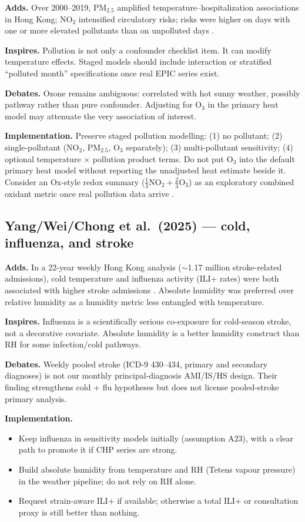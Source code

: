 \documentclass[11pt]{article}
\newcommand{\adds}{\textcolor{green!40!black}{\textbf{Adds.}}}
\newcommand{\inspires}{\textcolor{blue!55!black}{\textbf{Inspires.}}}
\newcommand{\debates}{\textcolor{orange!70!black}{\textbf{Debates.}}}
\newcommand{\impl}{\textcolor{purple!55!black}{\textbf{Implementation.}}}
\begin{document}
\adds{} Over 2000--2019, PM$_{2.5}$ amplified temperature--hospitalization
associations in Hong Kong; NO$_2$ intensified circulatory risks; risks were higher
on days with one or more elevated pollutants than on unpolluted days
\citep{guo2025temppollution}.

\inspires{} Pollution is not only a confounder checklist item. It can modify
temperature effects. Staged models should include interaction or stratified
``polluted month'' specifications once real EPIC series exist.

\debates{} Ozone remains ambiguous: correlated with hot sunny weather, possibly
pathway rather than pure confounder. Adjusting for O$_3$ in the primary heat model
may attenuate the very association of interest.

\impl{} Preserve staged pollution modelling:
(1) no pollutant;
(2) single-pollutant (NO$_2$, PM$_{2.5}$, O$_3$ separately);
(3) multi-pollutant sensitivity;
(4) optional temperature $\times$ pollution product terms.
Do not put O$_3$ into the default primary heat model without reporting the
unadjusted heat estimate beside it. Consider an Ox-style redox summary
($\frac{1}{3}$NO$_2 + \frac{2}{3}$O$_3$) as an exploratory combined oxidant metric
once real pollution data arrive \citep{wang2025coldflu}.

\subsection{Yang/Wei/Chong et al.\ (2025) --- cold, influenza, and stroke}

\adds{} In a 22-year weekly Hong Kong analysis ($\sim$1.17 million stroke-related
admissions), cold temperature and influenza activity (ILI+ rates) were both
associated with higher stroke admissions \citep{wang2025coldflu}. Absolute humidity
was preferred over relative humidity as a humidity metric less entangled with
temperature.

\inspires{} Influenza is a scientifically serious co-exposure for cold-season
stroke, not a decorative covariate. Absolute humidity is a better humidity
construct than RH for some infection/cold pathways.

\debates{} Weekly pooled stroke (ICD-9 430--434, primary and secondary diagnoses)
is not our monthly principal-diagnosis AMI/IS/HS design. Their finding strengthens
cold + flu hypotheses but does not license pooled-stroke primary analysis.

\impl{}
\begin{itemize}
  \item Keep influenza in sensitivity models initially (assumption A23), with a
        clear path to promote it if CHP series are strong.
  \item Build absolute humidity from temperature and RH (Tetens vapour pressure)
        in the weather pipeline; do not rely on RH alone.
  \item Request strain-aware ILI+ if available; otherwise a total ILI+ or
        consultation proxy is still better than nothing.
\end{itemize}
\end{document}
